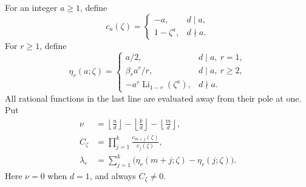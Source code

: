 \documentclass[11pt,a4paper,oneside,openany]{book}
\theoremstyle{definition}
\theoremstyle{remark}
\DeclareMathOperator{\Li}{Li}
\begin{document}
For an integer \(a\ge1\), define
\begin{equation}\label{qcc:root-constants}
 c_a(\zeta)=
 \begin{cases}
 -a,&d\mid a,\\
 1-\zeta^a,&d\nmid a.
 \end{cases}
\end{equation}
For \(r\ge1\), define
\begin{equation}\label{qcc:eta}
 \eta_r(a;\zeta)=
 \begin{cases}
 a/2,&d\mid a,\ r=1,\\[1mm]
 \beta_r a^r/r,&d\mid a,\ r\ge2,\\[1mm]
 -a^r\Li_{1-r}(\zeta^a),&d\nmid a.
 \end{cases}
\end{equation}
All rational functions in the last line are evaluated away from their pole at
one. Put
\begin{align}
 \nu&=\left\lfloor\frac nd\right\rfloor
       -\left\lfloor\frac kd\right\rfloor
       -\left\lfloor\frac md\right\rfloor,\label{qcc:root-order}\\
 C_\zeta&=\prod_{j=1}^{k}\frac{c_{m+j}(\zeta)}{c_j(\zeta)},\label{qcc:root-C}\\
 \lambda_r&=\sum_{j=1}^{k}
       \bigl(\eta_r(m+j;\zeta)-\eta_r(j;\zeta)\bigr).
       \label{qcc:root-lambda}
\end{align}
Here \(\nu=0\) when \(d=1\), and always \(C_\zeta\ne0\).
\end{document}
